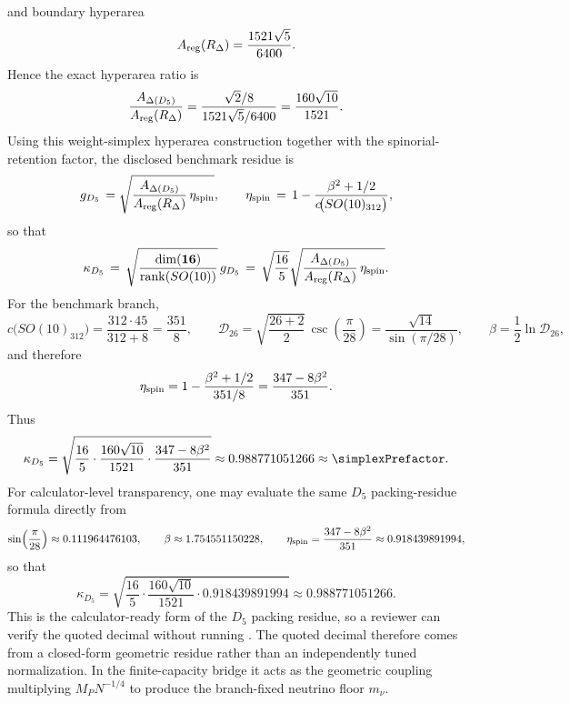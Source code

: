\documentclass[11pt]{article}
\begin{document}
and boundary hyperarea
\begin{equation}
 A_{\rm reg}(R_\Delta)=\frac{1521\sqrt5}{6400}.
\end{equation}
Hence the exact hyperarea ratio is
\begin{equation}
 \frac{A_{\Delta(D_5)}}{A_{\rm reg}(R_\Delta)}
 =
 \frac{\sqrt2/8}{1521\sqrt5/6400}
 =
 \frac{160\sqrt{10}}{1521}.
\end{equation}
Using this weight-simplex hyperarea construction together with the spinorial-retention factor, the disclosed benchmark residue is
\begin{equation}
 g_{D_5}
 \,=
 \sqrt{\frac{A_{\Delta(D_5)}}{A_{\rm reg}(R_\Delta)}\,\eta_{\rm spin}},
 \qquad
 \eta_{\rm spin}
 \,=\,
 1-\frac{\beta^2+1/2}{c\!\bigl(SO(10)_{312}\bigr)},
\end{equation}
so that
\begin{equation}
 \kappa_{D_5}
 \,=\,
 \sqrt{\frac{\dim(\mathbf{16})}{\operatorname{rank}(SO(10))}}\,g_{D_5}
 \,=\,
 \sqrt{\frac{16}{5}}
 \sqrt{\frac{A_{\Delta(D_5)}}{A_{\rm reg}(R_\Delta)}\,\eta_{\rm spin}}.
\end{equation}
For the benchmark branch,
\begin{equation}
 c\!\bigl(SO(10)_{312}\bigr)=\frac{312\cdot45}{312+8}=\frac{351}{8},
 \qquad
 \mathcal D_{26}=\sqrt{\frac{26+2}{2}}\,\csc\!\left(\frac{\pi}{28}\right)=\frac{\sqrt{14}}{\sin(\pi/28)},
 \qquad
 \beta=\frac12\ln\mathcal D_{26},
\end{equation}
and therefore
\begin{equation}
 \eta_{\rm spin}
 =
 1-\frac{\beta^2+1/2}{351/8}
 =
 \frac{347-8\beta^2}{351}.
\end{equation}
Thus
\begin{equation}
 \kappa_{D_5}
 =
 \sqrt{\frac{16}{5}\cdot\frac{160\sqrt{10}}{1521}\cdot\frac{347-8\beta^2}{351}}
 \approx
 0.988771051266
 \approx
 \simplexPrefactor.
\end{equation}
For calculator-level transparency, one may evaluate the same $D_5$ packing-residue formula directly from
\begin{equation}
 \sin\!\left(\frac{\pi}{28}\right)\approx 0.111964476103,
 \qquad
 \beta\approx 1.754551150228,
 \qquad
 \eta_{\rm spin}=\frac{347-8\beta^2}{351}\approx 0.918439891994,
\end{equation}
so that
\begin{equation}
 \kappa_{D_5}
 =
 \sqrt{\frac{16}{5}\cdot\frac{160\sqrt{10}}{1521}\cdot 0.918439891994}
 \approx
 0.988771051266.
\end{equation}
This is the calculator-ready form of the $D_5$ packing residue, so a reviewer can verify the quoted decimal without running .
The quoted decimal therefore comes from a closed-form geometric residue rather than an independently tuned normalization. In the finite-capacity bridge it acts as the geometric coupling multiplying $M_PN^{-1/4}$ to produce the branch-fixed neutrino floor $m_{\nu}$.
\end{document}
